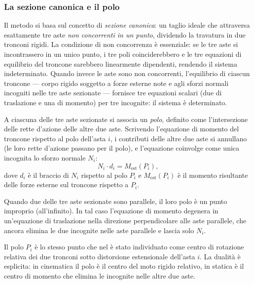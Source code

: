 \subsubsection{La sezione canonica e il polo}
\label{subsec:sezione_canonica}

Il metodo si basa sul concetto di \emph{sezione
	canonica}: un taglio ideale che attraversa esattamente
tre aste \emph{non concorrenti in un punto},
dividendo la travatura in due tronconi rigidi.
La condizione di non concorrenza è essenziale:
se le tre aste si incontrassero in un unico punto,
i tre poli coinciderebbero e le tre equazioni di
equilibrio del troncone sarebbero linearmente
dipendenti, rendendo il sistema indeterminato.
Quando invece le aste sono non concorrenti,
l'equilibrio di ciascun troncone --- corpo rigido
soggetto a forze esterne note e agli sforzi normali
incogniti nelle tre aste sezionate --- fornisce
tre equazioni scalari (due di traslazione e una
di momento) per tre incognite: il sistema è
determinato.

A ciascuna delle tre aste sezionate si associa
un \emph{polo}, definito come l'intersezione delle
rette d'azione delle altre due aste. Scrivendo
l'equazione di momento del troncone rispetto al polo
dell'asta $i$, i contributi delle altre due aste
si annullano (le loro rette d'azione passano per il
polo), e l'equazione coinvolge come unica incognita
lo sforzo normale $N_i$:
\begin{equation}\label{eq:ritter_momento}
	N_i \cdot d_i = M_\text{est}(P_i),
\end{equation}
dove $d_i$ è il braccio di $N_i$ rispetto al polo
$P_i$ e $M_\text{est}(P_i)$ è il momento risultante
delle forze esterne sul troncone rispetto a $P_i$.


Quando due delle tre aste sezionate sono parallele,
il loro polo è un punto improprio (all'infinito).
In tal caso l'equazione di momento degenera in
un'equazione di traslazione nella direzione
perpendicolare alle aste parallele, che ancora
elimina le due incognite nelle aste parallele e
lascia solo $N_i$.

\begin{oss}
	Il polo $P_i$ è lo stesso punto che nel
	 è stato
	individuato come centro di rotazione relativa
	dei due tronconi sotto distorsione estensionale
	dell'asta $i$. La dualità è esplicita: in
	cinematica il polo è il centro del moto rigido
	relativo, in statica è il centro di momento che
	elimina le incognite nelle altre due aste.
\end{oss}

